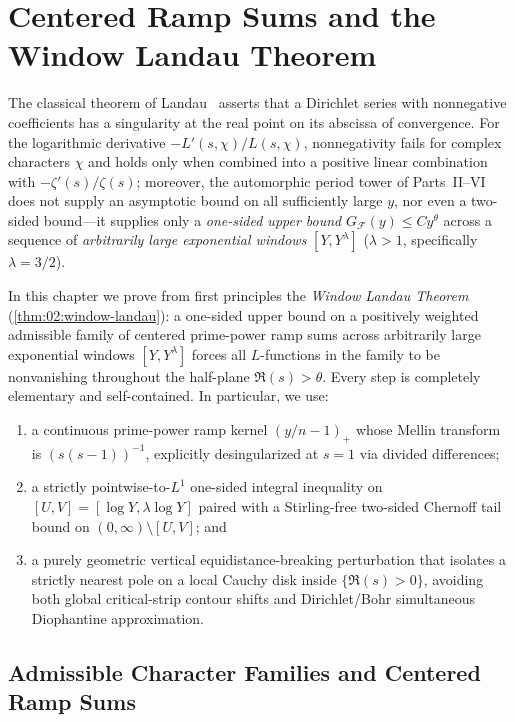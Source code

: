 \chapter{Centered Ramp Sums and the Window Landau Theorem}
\label{ch:02}

The classical theorem of Landau~\cite{Landau1905} asserts that a Dirichlet series with nonnegative coefficients has a singularity at the real point on its abscissa of convergence. For the logarithmic derivative $-L'(s, \chi)/L(s, \chi)$, nonnegativity fails for complex characters $\chi$ and holds only when combined into a positive linear combination with $-\zeta'(s)/\zeta(s)$; moreover, the automorphic period tower of Parts~II--VI does not supply an asymptotic bound on all sufficiently large $y$, nor even a two-sided bound—it supplies only a \emph{one-sided upper bound} $G_{\mathcal{F}}(y) \le C y^\theta$ across a sequence of \emph{arbitrarily large exponential windows} $[Y, Y^\lambda]$ ($\lambda > 1$, specifically $\lambda = 3/2$).

In this chapter we prove from first principles the \emph{Window Landau Theorem} (\cref{thm:02:window-landau}): a one-sided upper bound on a positively weighted admissible family of centered prime-power ramp sums across arbitrarily large exponential windows $[Y, Y^\lambda]$ forces all $L$-functions in the family to be nonvanishing throughout the half-plane $\Re(s) > \theta$. Every step is completely elementary and self-contained. In particular, we use:
\begin{enumerate}[label=(\roman*)]
\item a continuous prime-power ramp kernel $(y/n - 1)_+$ whose Mellin transform is $(s(s-1))^{-1}$, explicitly desingularized at $s=1$ via divided differences;
\item a strictly pointwise-to-$L^1$ one-sided integral inequality on $[U, V] = [\log Y, \lambda \log Y]$ paired with a Stirling-free two-sided Chernoff tail bound on $(0, \infty) \setminus [U, V]$; and
\item a purely geometric vertical equidistance-breaking perturbation that isolates a strictly nearest pole on a local Cauchy disk inside $\{\Re(s) > 0\}$, avoiding both global critical-strip contour shifts and Dirichlet/Bohr simultaneous Diophantine approximation.
\end{enumerate}

\section{Admissible Character Families and Centered Ramp Sums}
\label{sec:02:ramps}

